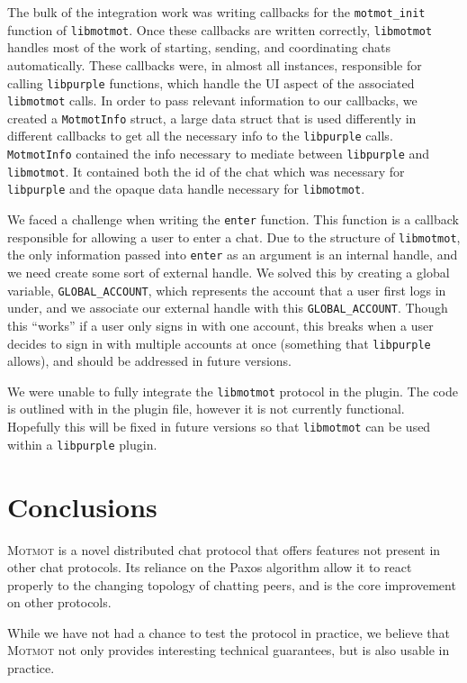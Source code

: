 \documentclass{sig-alternate}
\newcommand\Motmot{\textsc{Motmot}\xspace}
\newcommand\libmotmot{\texttt{libmotmot}\xspace}
\newcommand\libpurple{\texttt{libpurple}\xspace}
\begin{document}
The bulk of the integration work was writing callbacks for the
\verb`motmot_init` function of \libmotmot.  Once these callbacks are written
correctly, \libmotmot handles most of the work of starting, sending, and
coordinating chats automatically.  These callbacks were, in almost all
instances, responsible for calling \libpurple functions, which handle the UI
aspect of the associated \libmotmot calls.  In order to pass relevant
information to our callbacks, we created a \verb`MotmotInfo` struct, a large
data struct that is used differently in different callbacks to get all the
necessary info to the \libpurple calls. \verb`MotmotInfo` contained the info
necessary to mediate between \libpurple and \libmotmot. It contained both the
id of the chat which was necessary for \libpurple and the opaque data handle
necessary for \libmotmot.

We faced a challenge when writing the \verb`enter` function.  This function is a
callback responsible for allowing a user to enter a chat.  Due to the structure
of \libmotmot, the only information passed into \verb`enter` as an argument is
an internal handle, and we need create some sort of external handle.  We solved
this by creating a global variable, \verb`GLOBAL_ACCOUNT`, which represents the
account that a user first logs in under, and we associate our external handle
with this \verb`GLOBAL_ACCOUNT`.  Though this ``works'' if a user only signs in
with one account, this breaks when a user decides to sign in with multiple
accounts at once (something that \libpurple allows), and should be addressed in
future versions.

We were unable to fully integrate the \libmotmot protocol in the plugin.
The code is outlined with in the plugin file, however it is not currently
functional. Hopefully this will be fixed in future versions so that
\libmotmot can be used within a \libpurple plugin.

\section{Conclusions}

\Motmot is a novel distributed chat protocol that offers features not present in
other chat protocols. Its reliance on the Paxos algorithm allow it to react
properly to the changing topology of chatting peers, and is the core improvement
on other protocols.

While we have not had a chance to test the protocol in practice, we believe that
\Motmot not only provides interesting technical guarantees, but is also usable
in practice.
\end{document}

